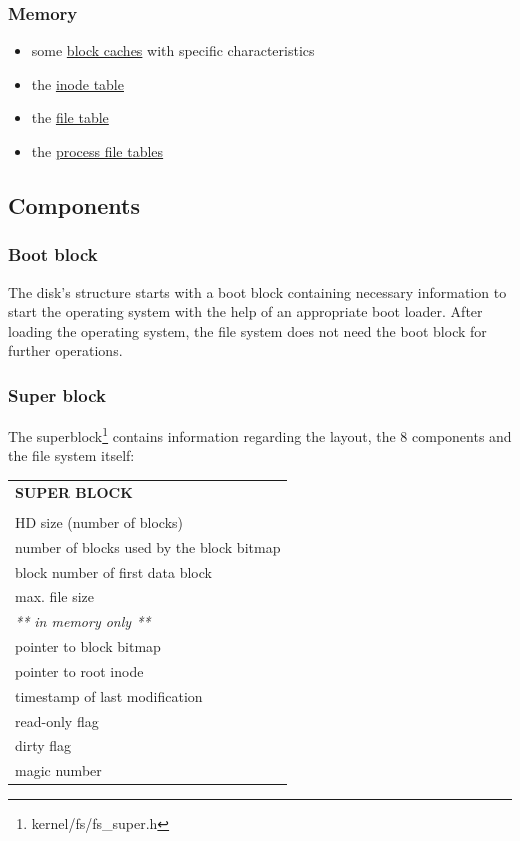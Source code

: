 \documentclass[11pt,a4paper]{scrartcl}
\begin{document}
\subsubsection{Memory}
\begin{itemize}
\item{some \hyperlink{blockcaches}{block caches} with specific characteristics}
\item{the \hyperlink{inodetable}{inode table}}
\item{the \hyperlink{filetable}{file table}}
\item{the \hyperlink{processfiletable}{process file tables}}
\end{itemize}

\subsection{Components}
\subsubsection{Boot block}
\hypertarget{bootblock}{}
The disk's structure starts with a boot block containing necessary information to start the operating system with the help of an appropriate boot loader. After loading the operating system, the file system does not need the boot block for further operations. 

\subsubsection{Super block}
\hypertarget{superblock}{}
The superblock\footnote{kernel/fs/fs\_super.h} contains information regarding the layout, the 8 components and the file system itself:

\vspace{0.3cm}
\begin{tabular}{|l|}
\hline
\textbf{SUPER BLOCK}\\\\\hline
HD size (number of blocks)\\\hline
number of blocks used by the block bitmap\\\hline
block number of first data block\\\hline
max. file size\\\hline
\hline
\textit{** in memory only **}\\\hline
pointer to block bitmap\\\hline
pointer to root inode\\\hline
timestamp of last modification\\\hline
read-only flag\\\hline
dirty flag\\\hline
magic number\\\hline
\end{tabular}
\end{document}
